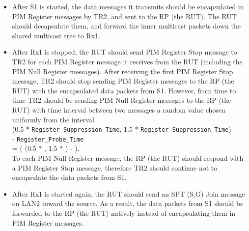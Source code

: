 \documentclass[11pt]{report}
\begin{document}


\begin{itemize}

  \item After S1 is started, the data messages it transmits should be
  encapsulated in PIM Register messages by TR2, and sent to the RP (the
  RUT). The RUT should decapsulate them, and forward the inner multicast
  packets down the shared multicast tree to Rx1.

  \item After Rx1 is stopped, the RUT should send PIM Register Stop message to
  TR2 for each PIM Register message it receives from the RUT (including
  the PIM Null Register messages). After receiving the first PIM Register Stop
  message, TR2 should stop sending PIM Register messages to the RP (the RUT)
  with the encapsulated data packets from S1.
  However, from time to time TR2 should be sending PIM Null Register
  messages to the RP (the RUT) with time interval between two messages a random
  value chosen uniformly from the interval \\
  (0.5 * \verb=Register_Suppression_Time=,
  1.5 * \verb=Register_Suppression_Time=) \\
  - \verb=Register_Probe_Time= \\
  = ( (0.5 * {\PimsmRegisterSuppressionTime}, 1.5 *
  {\PimsmRegisterSuppressionTime}) - {\PimsmRegisterProbeTime} ). \\
  To each PIM Null Register message, the RP (the RUT) should respond with a
  PIM Register Stop message, therefore TR2 should continue not to
  encapsulate the data packets from S1.

  \item After Rx1 is started again, the RUT should send an SPT (S,G) Join
  message on LAN2 toward the source. As a result, the data packets from S1
  should be forwarded to the RP (the RUT) natively instead of encapsulating
  them in PIM Register messages.

\end{itemize}

\end{document}
